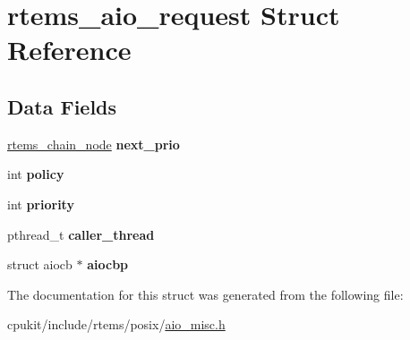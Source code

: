 \hypertarget{structrtems__aio__request}{}\section{rtems\+\_\+aio\+\_\+request Struct Reference}
\label{structrtems__aio__request}
\subsection*{Data Fields}
\begin{DoxyCompactItemize}
\item 
\mbox{\label{structrtems__aio__request_a2a9253f0baf6924a8e0422f845e211c6}} 
\mbox{\hyperlink{structChain__Node__struct}{rtems\+\_\+chain\+\_\+node}} {\bfseries next\+\_\+prio}
\item 
\mbox{\label{structrtems__aio__request_aa4cd4288c71dac03362e2e51da893b38}} 
int {\bfseries policy}
\item 
\mbox{\label{structrtems__aio__request_a7ea0e90c573897d2c14e53f18d29dba4}} 
int {\bfseries priority}
\item 
\mbox{\label{structrtems__aio__request_afdee4abd7d3ef67ba59c5ae7f7816955}} 
pthread\+\_\+t {\bfseries caller\+\_\+thread}
\item 
\mbox{\label{structrtems__aio__request_ae8dba1680ff8082c9a5a1441c1dfb4f5}} 
struct aiocb $\ast$ {\bfseries aiocbp}
\end{DoxyCompactItemize}


The documentation for this struct was generated from the following file\+:\begin{DoxyCompactItemize}
\item 
cpukit/include/rtems/posix/\mbox{\hyperlink{aio__misc_8h}{aio\+\_\+misc.\+h}}\end{DoxyCompactItemize}
